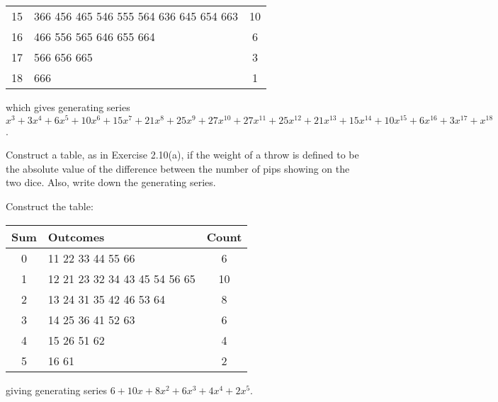 \begin{enumerate}
\begin{sol}
\begin{center}
\begin{tabular}{c|l|c}
              15  & 366 456 465 546 555 564 636 645 654 663                                                                     & 10    \\
              16  & 466 556 565 646 655 664                                                                                     & 6     \\
              17  & 566 656 665                                                                                                 & 3     \\
              18  & 666                                                                                                         & 1
            \end{tabular}
          \end{center}
          which gives generating series $x^3 + 3x^4 + 6x^5 + 10x^6 + 15x^7 + 21x^8 + 25x^9 + 27x^{10} + 27x^{11} + 25x^{12} + 21x^{13} + 15x^{14} + 10x^{15} + 6x^{16} + 3x^{17} + x^{18}$.
        \end{sol}
\end{enumerate}

\begin{xca}
  Construct a table, as in Exercise 2.10(a),
  if the weight of a throw is defined to be
  the absolute value of the difference between
  the number of pips showing on the two dice.
  Also, write down the generating series.
\end{xca}
\begin{sol}
  Construct the table:
  \begin{center}
    \begin{tabular}{c|l|c}
      Sum & Outcomes                      & Count \\ \hline
      0   & 11 22 33 44 55 66             & 6     \\
      1   & 12 21 23 32 34 43 45 54 56 65 & 10    \\
      2   & 13 24 31 35 42 46 53 64       & 8     \\
      3   & 14 25 36 41 52 63             & 6     \\
      4   & 15 26 51 62                   & 4     \\
      5   & 16 61                         & 2
    \end{tabular}
  \end{center}
  giving generating series $6 + 10x + 8x^2 + 6x^3 + 4x^4 + 2x^5$.
\end{sol}

